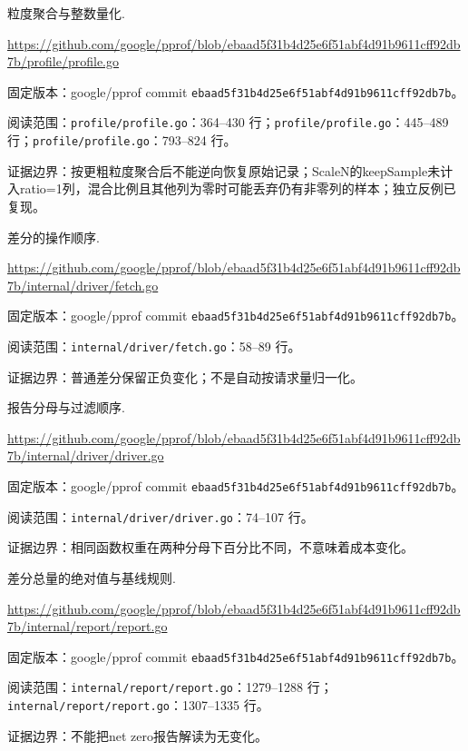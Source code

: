 \documentclass[UTF8,fontset=fandol,openany,11pt]{ctexbook}
\begin{document}
\begin{thebibliography}{999}
 粒度聚合与整数量化.\par
\url{https://github.com/google/pprof/blob/ebaad5f31b4d25e6f51abf4d91b9611cff92db7b/profile/profile.go}\par
{\small\raggedright 固定版本：google/pprof commit \texttt{ebaad5f3\allowbreak{}1b4d25e6\allowbreak{}f51abf4d\allowbreak{}91b9611c\allowbreak{}ff92db7b}。\par
阅读范围：\nolinkurl{profile/profile.go}：364–430 行；\nolinkurl{profile/profile.go}：445–489 行；\nolinkurl{profile/profile.go}：793–824 行。\par
证据边界：按更粗粒度聚合后不能逆向恢复原始记录；ScaleN的keepSample未计入ratio=1列，混合比例且其他列为零时可能丢弃仍有非零列的样本；独立反例已复现。
}

 差分的操作顺序.\par
\url{https://github.com/google/pprof/blob/ebaad5f31b4d25e6f51abf4d91b9611cff92db7b/internal/driver/fetch.go}\par
{\small\raggedright 固定版本：google/pprof commit \texttt{ebaad5f3\allowbreak{}1b4d25e6\allowbreak{}f51abf4d\allowbreak{}91b9611c\allowbreak{}ff92db7b}。\par
阅读范围：\nolinkurl{internal/driver/fetch.go}：58–89 行。\par
证据边界：普通差分保留正负变化；不是自动按请求量归一化。
}

 报告分母与过滤顺序.\par
\url{https://github.com/google/pprof/blob/ebaad5f31b4d25e6f51abf4d91b9611cff92db7b/internal/driver/driver.go}\par
{\small\raggedright 固定版本：google/pprof commit \texttt{ebaad5f3\allowbreak{}1b4d25e6\allowbreak{}f51abf4d\allowbreak{}91b9611c\allowbreak{}ff92db7b}。\par
阅读范围：\nolinkurl{internal/driver/driver.go}：74–107 行。\par
证据边界：相同函数权重在两种分母下百分比不同，不意味着成本变化。
}

 差分总量的绝对值与基线规则.\par
\url{https://github.com/google/pprof/blob/ebaad5f31b4d25e6f51abf4d91b9611cff92db7b/internal/report/report.go}\par
{\small\raggedright 固定版本：google/pprof commit \texttt{ebaad5f3\allowbreak{}1b4d25e6\allowbreak{}f51abf4d\allowbreak{}91b9611c\allowbreak{}ff92db7b}。\par
阅读范围：\nolinkurl{internal/report/report.go}：1279–1288 行；\nolinkurl{internal/report/report.go}：1307–1335 行。\par
证据边界：不能把net zero报告解读为无变化。
}


\end{thebibliography}
\end{document}
